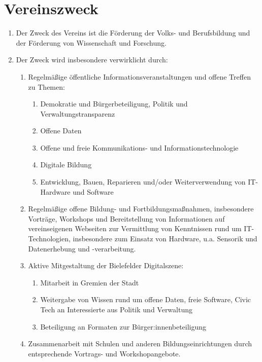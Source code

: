 \documentclass[12pt,a4paper,draft]{article}
\begin{document}
\section{Vereinszweck} %
\begin{enumerate}
\item Der Zweck des Vereins ist die Förderung der Volks- und Berufsbildung und der Förderung von Wissenschaft und Forschung. %

\item Der Zweck wird insbesondere verwirklicht durch:

\begin{enumerate}
\item Regelmäßige öffentliche Informationsveranstaltungen und offene Treffen zu Themen:
\begin{enumerate}
\item Demokratie und Bürgerbeteiligung, Politik und Verwaltungstransparenz
\item Offene Daten
\item Offene und freie Kommunikations- und Informationstechnologie
\item Digitale Bildung
\item Entwicklung, Bauen, Reparieren und/oder Weiterverwendung von IT-Hardware und Software
\end{enumerate}

\item Regelmäßige offene Bildung- und Fortbildungsmaßnahmen, insbesondere Vorträge, Workshops und Bereitstellung von Informationen auf vereinseigenen Webseiten zur Vermittlung von Kenntnissen rund um IT-Technologien, insbesondere zum Einsatz von Hardware, u.a. Sensorik und Datenerhebung und -verarbeitung.

\item Aktive Mitgestaltung der Bielefelder Digitalszene:
\begin{enumerate}
\item Mitarbeit in Gremien der Stadt
\item Weitergabe von Wissen rund um offene Daten,  freie Software,  Civic Tech an Interessierte aus Politik und Verwaltung
\item Beteiligung an Formaten zur Bürger:innenbeteiligung
\end{enumerate}

\item Zusammenarbeit mit Schulen und anderen Bildungseinrichtungen durch entsprechende Vortrags- und Workshopangebote.


\end{enumerate}
\end{enumerate}
\end{document}
